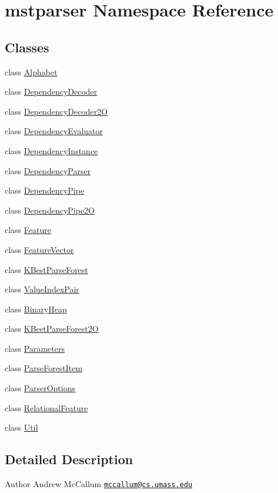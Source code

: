 \hypertarget{namespacemstparser}{
\section{mstparser Namespace Reference}
\label{namespacemstparser}
}
\subsection*{Classes}
\begin{DoxyCompactItemize}
\item 
class \hyperlink{classmstparser_1_1Alphabet}{Alphabet}
\item 
class \hyperlink{classmstparser_1_1DependencyDecoder}{DependencyDecoder}
\item 
class \hyperlink{classmstparser_1_1DependencyDecoder2O}{DependencyDecoder2O}
\item 
class \hyperlink{classmstparser_1_1DependencyEvaluator}{DependencyEvaluator}
\item 
class \hyperlink{classmstparser_1_1DependencyInstance}{DependencyInstance}
\item 
class \hyperlink{classmstparser_1_1DependencyParser}{DependencyParser}
\item 
class \hyperlink{classmstparser_1_1DependencyPipe}{DependencyPipe}
\item 
class \hyperlink{classmstparser_1_1DependencyPipe2O}{DependencyPipe2O}
\item 
class \hyperlink{classmstparser_1_1Feature}{Feature}
\item 
class \hyperlink{classmstparser_1_1FeatureVector}{FeatureVector}
\item 
class \hyperlink{classmstparser_1_1KBestParseForest}{KBestParseForest}
\item 
class \hyperlink{classmstparser_1_1ValueIndexPair}{ValueIndexPair}
\item 
class \hyperlink{classmstparser_1_1BinaryHeap}{BinaryHeap}
\item 
class \hyperlink{classmstparser_1_1KBestParseForest2O}{KBestParseForest2O}
\item 
class \hyperlink{classmstparser_1_1Parameters}{Parameters}
\item 
class \hyperlink{classmstparser_1_1ParseForestItem}{ParseForestItem}
\item 
class \hyperlink{classmstparser_1_1ParserOptions}{ParserOptions}
\item 
class \hyperlink{classmstparser_1_1RelationalFeature}{RelationalFeature}
\item 
class \hyperlink{classmstparser_1_1Util}{Util}
\end{DoxyCompactItemize}


\subsection{Detailed Description}
\begin{DoxyAuthor}{Author}
Andrew McCallum \href{mailto:mccallum@cs.umass.edu}{\tt mccallum@cs.umass.edu} 
\end{DoxyAuthor}
